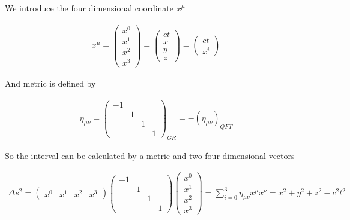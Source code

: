 
We introduce the four dimensional coordinate $x^{\mu}$

\begin{align}
    x^{\mu}=\begin{pmatrix}
    x^{0}\\
    x^{1}\\
    x^{2}\\
    x^{3}
    \end{pmatrix}=\begin{pmatrix}
    ct\\
    x\\
    y\\
    z
    \end{pmatrix}=\begin{pmatrix}
    ct\\
    x^{i}
    \end{pmatrix}
\end{align}

And metric is defined by

\begin{align}
    \eta_{\mu \nu}=\begin{pmatrix}
    -1 &  &  & \\
     & 1 &  & \\
     &  & 1 & \\
     &  &  & 1
    \end{pmatrix}_{GR}=-(\eta_{\mu\nu})_{QFT}
\end{align}

So the interval can be calculated by a metric and two four dimensional vectors

\begin{align}
    \Delta s^{2}=\begin{pmatrix}
    x^{0} &x^{1}  &x^{2}  &x^{3} 
    \end{pmatrix} \begin{pmatrix}
    -1 &  &  & \\
     & 1 &  & \\
     &  & 1 & \\
     &  &  & 1
    \end{pmatrix} \begin{pmatrix}
    x^{0}\\
    x^{1}\\
    x^{2}\\
    x^{3}
    \end{pmatrix}=\sum_{i=0}^{3}\eta_{\mu\nu}x^{\mu}x^{\nu}=x^{2}+y^{2}+z^{2}-c^{2}t^{2}
\end{align}

